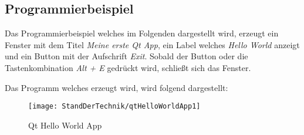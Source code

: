 \subsection{Programmierbeispiel}
\label{subsec:programmierbeispiel}
Das Programmierbeispiel welches im Folgenden dargestellt wird, erzeugt ein Fenster mit dem Titel 
\emph{Meine erste Qt App}, ein Label welches \emph{Hello World} anzeigt und ein Button mit der
Aufschrift \emph{Exit}. Sobald der Button oder die Tastenkombination \emph{Alt + E} gedrückt
wird, schließt sich das Fenster.



Das Programm welches erzeugt wird, wird folgend dargestellt:
\begin{figure}[h]
    \centering
    \texttt{[image: StandDerTechnik/qtHelloWorldApp1]}
    \caption[Qt Hello World App]{Qt Hello World App}
    \label{img:qtHelloWorldApp}
\end{figure}